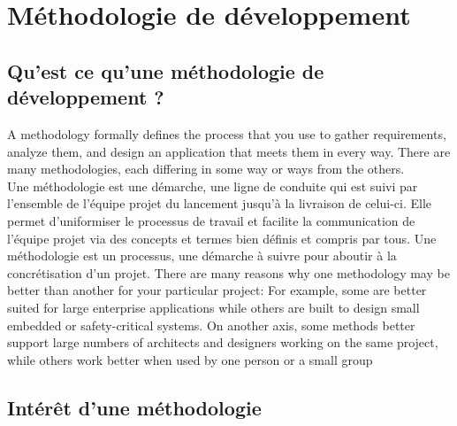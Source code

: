 \chapter{Méthodologie de développement}

\section{Qu'est ce qu'une méthodologie de développement ?}
A methodology formally defines the process that you use to gather requirements, analyze them, and design an application that meets them in every way. There are many methodologies, each differing in some way or ways from the others. \\
Une méthodologie est une démarche, une ligne de conduite qui est suivi par l’ensemble de l’équipe projet du lancement jusqu’à la livraison de celui-ci. Elle permet d’uniformiser le processus de travail et facilite la communication de l’équipe projet via des concepts et termes bien définis et compris par tous.
Une méthodologie est un processus, une démarche à suivre pour aboutir à la concrétisation d'un projet.
There are many reasons why one methodology may be better than another for your particular project: For example, some are better suited for large enterprise applications while others are built to design small embedded or safety-critical systems. On another axis, some methods better support large numbers of architects and designers working on the same project, while others work better when used by one person or a small group

\section{Intérêt d'une méthodologie}



                             
